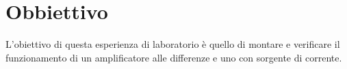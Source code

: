 \section*{Obbiettivo}

L'obiettivo di questa esperienza di laboratorio è quello di montare e verificare il funzionamento di un amplificatore alle differenze e uno con sorgente di corrente.
